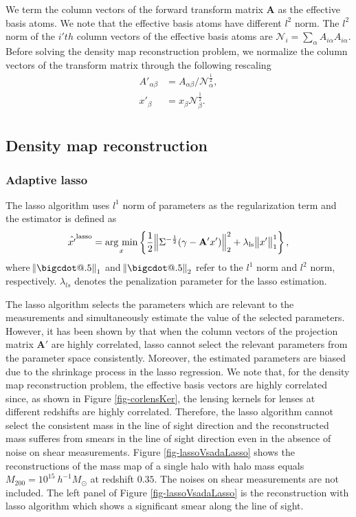 \documentclass[twocolumn]{aastex62}
\makeatletter
\newcommand*\bigcdot{\mathpalette\bigcdot@{.5}}
\newcommand*\bigcdot@[2]{\mathbin{\vcenter{\hbox{\scalebox{#2}{$\m@th#1\bullet$}}}}}
\newcommand{\argmin}{\mathop{\rm arg~min}\limits}
\makeatother
\begin{document}
We term the column vectors of the forward transform matrix $\mathbf{A}$ as the effective basis atoms. We note that the
effective basis atoms have different $l^2$ norm. The $l^2$ norm of the $i'th$ column vectors of the effective basis atoms are
$\mathcal{N}_{i}=\sum_\alpha A_{i\alpha}A_{i\alpha}$. Before solving the density map reconstruction problem, we normalize
the column
vectors of the transform matrix through the following rescaling
\begin{equation}
\begin{split}
A'_{\alpha\beta}&=A_{\alpha\beta}/\mathcal{N}_{\alpha}^{\frac{1}{2}},\\
x'_{\beta}&=x_{\beta}\mathcal{N}_{\beta}^{\frac{1}{2}}.\\
\end{split}
\end{equation}

\subsection{Density map reconstruction}
\label{subsec:method-reconstruction}

\subsubsection{Adaptive lasso}

The lasso algorithm uses $l^1$ norm of parameters as the regularization term and the estimator is defined as
\begin{equation}
\hat{x'}^{\rm{lasso}}=\argmin_{x} \left\{ \frac{1}{2}\norm{\Sigma^{-\frac{1}{2}}(\gamma- \mathbf{A'} x')}_2^2+ \lambda_{\rm{ls}} \norm{x'}^1_1\right\},
\end{equation}
where $\norm{\bigcdot}_1$ and $\norm{\bigcdot}_2$ refer to the $l^1$ norm and $l^2$ norm, respectively.
$\lambda_{ls}$ denotes the penalization parameter for the lasso estimation.

The lasso algorithm selects the parameters which are relevant to the measurements and simultaneously estimate the value of
the selected parameters. However, it has been shown by
\citet{AdaLASSO-Zou2006} that when the column vectors of the projection matrix $\mathbf{A'}$ are highly correlated,
lasso cannot select the relevant parameters from the parameter space consistently. Moreover, the estimated parameters
are biased due to the shrinkage process in the lasso regression. We note that, for the density map reconstruction problem,
the effective basis vectors are highly correlated since, as shown in Figure \ref{fig-corlensKer}, the lensing kernels for
lenses at different redshifts are highly correlated. Therefore, the lasso algorithm cannot select the consistent mass in
the line of sight direction and the reconstructed mass sufferes from smears in the line of sight direction even in the
absence of noise on shear measurements.
Figure \ref{fig-lassoVsadaLasso} shows the reconstructions of the mass map of a single halo with halo mass equals
$M_{200}=10^{15} ~h^{-1}M_{\odot}$ at redshift $0.35$. The noises on shear measurements are not included. The left panel of
Figure \ref{fig-lassoVsadaLasso} is the reconstruction with lasso algorithm which shows a significant smear along the line of sight.
\end{document}
